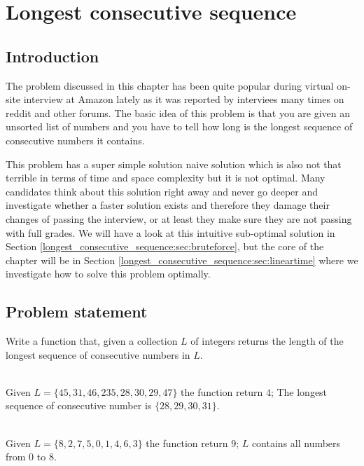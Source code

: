 %




\chapter{Longest consecutive sequence}
\label{ch:longest_consecutive_sequence}
\section*{Introduction}
The problem discussed in this chapter has been quite popular during virtual on-site interview at Amazon lately as it was reported by interviees many times on reddit and other forums. 
The basic idea of this problem is that you are given an unsorted list of numbers and you have to tell how long is the longest sequence of consecutive numbers it contains. 

This problem has a super simple solution naive solution which is also not that terrible in terms of time and space complexity but it is not optimal.
Many candidates think about this solution right away and never go deeper and investigate whether a faster solution exists and therefore they damage their changes of passing the interview, or at least they make sure they are not passing with full grades.
We will have a look at this intuitive sub-optimal solution in Section \ref{longest_consecutive_sequence:sec:bruteforce}, but the core of the chapter will be in Section \ref{longest_consecutive_sequence:sec:lineartime} where we investigate how to solve this problem optimally. 

\section{Problem statement}
\begin{exercise}
Write a function that, given a collection $L$ of integers returns the length of the longest sequence of consecutive numbers in $L$.
\label{example:longest_consecutive_sequence:exercice1}

	\begin{example}
		\label{example:longest_consecutive_sequence:example1}
		\hfill \\
		Given $L=\{45,31,46,235,28,30,29,47\}$ the function return $4$; The longest sequence of consecutive number is $\{28,29,30,31\}$.		
	\end{example}

	\begin{example}
		\label{example:longest_consecutive_sequence:example2}
		\hfill \\
		Given $L=\{8,2,7,5,0,1,4,6,3\}$ the function return $9$; $L$ contains all numbers from $0$ to $8$.				
	\end{example}

\end{exercise}

